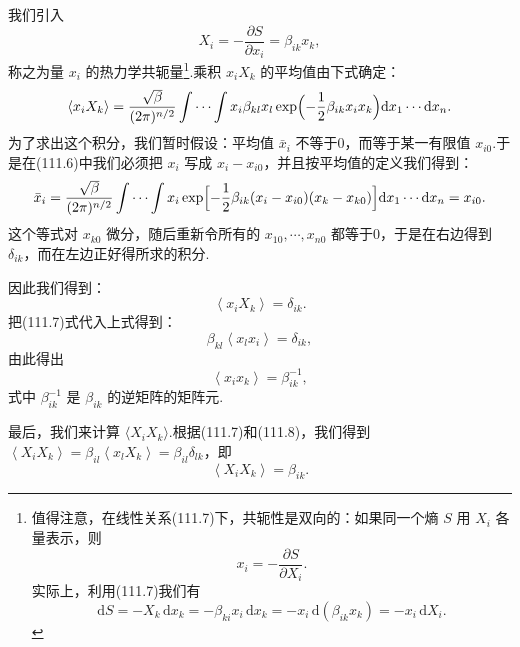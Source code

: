 我们引入
\begin{equation}
  X_{i}=-\frac{\partial S}{\partial x_{i}}=\beta_{ik}x_{k},
\end{equation}
称之为量 $x_{i}$ 的热力学共轭量\footnote{值得注意，在线性关系(111.7)下，共轭性是双向的：如果同一个熵 $S$ 用 $X_i$ 各量表示，则
\begin{equation*}
  x_{i}=-\frac{\partial S}{\partial X_{i}}.\tag{111.7a}
\end{equation*}
实际上，利用(111.7)我们有
\begin{equation*}
  \mathrm{d}S=-X_{k}\,\mathrm{d}x_{k}
  =-\beta_{ki}x_{i}\,\mathrm{d}x_{k}
  =-x_{i}\,\mathrm{d}(\beta_{ik}x_{k})
  =-x_{i}\,\mathrm{d}X_{i}.
\end{equation*}}.乘积 $x_{i}X_{k}$ 的平均值由下式确定：
\begin{equation*}
  \left\langle x_{i}X_{k}\right\rangle=\frac{\sqrt{\beta}}{(2\pi)^{n/2}}
  \int\cdots\int x_{i}\beta_{kl}x_{l}
  \exp\Bigl(-\frac{1}{2}\beta_{ik}x_{i}x_{k}\Bigr)
  \mathrm{d}x_{1}\cdots\mathrm{d}x_{n}.
\end{equation*}
为了求出这个积分，我们暂时假设：平均值 $\bar{x}_{i}$ 不等于0，而等于某一有限值 $x_{i0}$.于是在(111.6)中我们必须把 $x_{i}$ 写成 $x_{i}-x_{i0}$，并且按平均值的定义我们得到：
\begin{equation*}
  \bar{x}_{i}=\frac{\sqrt{\beta}}{(2\pi)^{n/2}}
  \int\cdots\int x_{i}\exp\Bigl[-\frac{1}{2}\beta_{ik}
  (x_{i}-x_{i0})(x_{k}-x_{k0})\Bigr]\mathrm{d}x_{1}\cdots\mathrm{d}x_{n}
  =x_{i0}.
\end{equation*}
这个等式对 $x_{k0}$ 微分，随后重新令所有的 $x_{10},\cdots,x_{n0}$ 都等于0，于是在右边得到 $\delta_{ik}$，而在左边正好得所求的积分.

因此我们得到：
\begin{equation}
  \left\langle x_{i}X_{k}\right\rangle=\delta_{ik}.
\end{equation}
把(111.7)式代入上式得到：
\begin{equation*}
  \beta_{kl}\left\langle x_{l}x_{i}\right\rangle=\delta_{ik},
\end{equation*}
由此得出
\begin{equation}
  \left\langle x_{i}x_{k}\right\rangle=\beta_{ik}^{-1},
\end{equation}
式中 $\beta_{ik}^{-1}$ 是 $\beta_{ik}$ 的逆矩阵的矩阵元.

最后，我们来计算 $\langle X_{i}X_{k}\rangle$.根据(111.7)和(111.8)，我们得到
$\left\langle X_{i}X_{k}\right\rangle=\beta_{il}\left\langle x_{l}X_{k}\right\rangle
=\beta_{il}\delta_{lk}$，即
\begin{equation}
  \left\langle X_{i}X_{k}\right\rangle=\beta_{ik}.
\end{equation}

